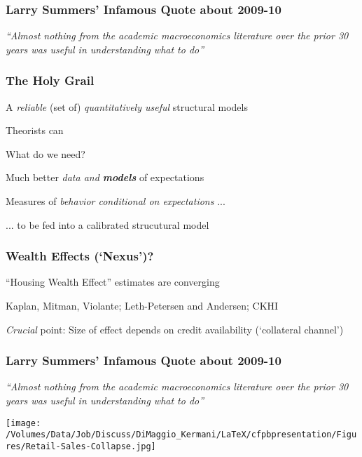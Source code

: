 \documentclass{beamer}
\begin{document}
\begin{frame}\frametitle{Larry Summers' Infamous Quote about 2009-10}

{\it ``Almost nothing from the academic macroeconomics literature over the prior
30 years was useful in understanding what to do''} 


\begin{center}
\end{center}

\end{frame}


\begin{frame}\frametitle{The Holy Grail}

\bi
\item A {\it reliable} (set of) {\it quantitatively useful} structural models
\bi
\item Theorists can 
\ei
\item What do we need?
\bi 
\item Much better {\it data and  {\bf models}} of expectations
\item Measures of {\it behavior conditional on expectations} ...
\item ... to be fed into a calibrated strucutural model
\ei
\ei

\end{frame}

\begin{frame}\frametitle{Wealth Effects (`Nexus')?}
\bi
\item ``Housing Wealth Effect'' estimates are converging
\item Kaplan, Mitman, Violante; Leth-Petersen and Andersen; CKHI
\item {\it Crucial} point: Size of effect depends on credit availability (`collateral channel')
\ei
\end{frame}


\begin{frame}\frametitle{Larry Summers' Infamous Quote about 2009-10}

{\it ``Almost nothing from the academic macroeconomics literature over the prior
30 years was useful in understanding what to do''} 

\begin{center}
\texttt{[image: /Volumes/Data/Job/Discuss/DiMaggio\_Kermani/LaTeX/cfpbpresentation/Figures/Retail-Sales-Collapse.jpg]}
\end{center}

\end{frame}
\end{document}

